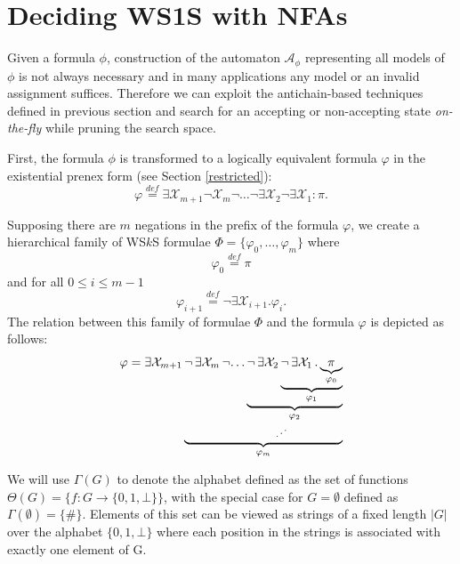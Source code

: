 \section{Deciding WS1S with NFAs}

Given a formula $\phi$, construction of the automaton $\mathcal{A}_\phi$
representing all models of $\phi$ is not always necessary and in many
applications any model or an invalid assignment suffices.
Therefore we can exploit the antichain-based techniques defined in previous
section and search for an accepting or non-accepting state \emph{on-the-fly}
while pruning the search space.

First, the formula $\phi$ is transformed to a logically equivalent formula
$\varphi$ in the existential prenex form (see Section \ref{restricted}):
\begin{equation*}
 \varphi \overset{\mathit{def}}{=}
 \exists\mathcal{X}_{m+1}\neg\mathcal{X}_m\neg\ldots\neg\exists\mathcal{X}_2\neg\exists\mathcal{X}_1
 :
 \pi.
\end{equation*}

Supposing there are $m$	negations in the prefix of the formula $\varphi$, we
create a hierarchical family of WS$k$S formulae $\Phi = \{\varphi_0,\ldots,\varphi_m\}$
where
\begin{equation}
  \varphi_0 \overset{\mathit{def}}{=} \pi
\end{equation}
and for all $0 \leq i \leq m-1$
\begin{equation}
 \varphi_{i+1} \overset{\mathit{def}}{=} \neg\exists\mathcal{X}_{i+1}.
 \varphi_i.
\end{equation}
The relation between this family of formulae $\Phi$ and the formula $\varphi$ is
depicted as follows:
\begin{equation}
\begin{aligned}
\varphi = \exists \mathcal{X}_{m+1}\,
\underset{\varphi_m}{\underbrace{
  \neg\,\exists \mathcal{X}_m\,
  \neg
  \underset{\hspace{-3mm}\iddots}{
    \dots 
    \underset{\varphi_2}{\underbrace{
      \neg \,\exists \mathcal{X}_2\,
      \underset{\varphi_1}{\underbrace{
        \neg \,\exists \mathcal{X}_1\,.\,
        \underset{\varphi_0}{\underbrace{
          \pi
        }}
      }}
    }}
  }
}}
\end{aligned}
\end{equation}

We will use $\Gamma(G)$ to denote the alphabet defined as the
set of functions $\Theta(G) = \{f : G \rightarrow \{0, 1, \bot\}\}$, with the
special case for $G = \emptyset$ defined as $\Gamma(\emptyset) = \{\#\}$. Elements of this set can
be viewed as strings of a fixed length $|G|$ over the alphabet $\{0, 1, \bot\}$
where each position in the strings is associated with exactly one element of G.

